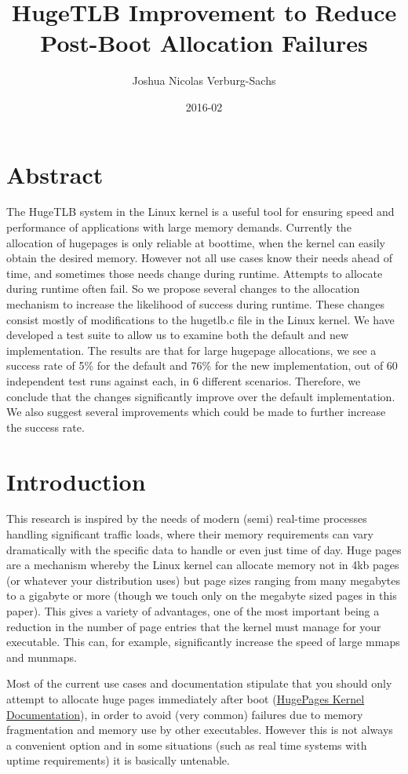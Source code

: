 \documentclass{article}
\title{HugeTLB Improvement to Reduce Post-Boot Allocation Failures}
\date{2016-02}
\author{Joshua Nicolas Verburg-Sachs}
\begin{document}
	\maketitle
	\newpage
	\tableofcontents
	\newpage

	\section{Abstract}
		The HugeTLB system in the Linux kernel is a useful tool for ensuring speed and performance of applications with large memory demands. Currently the allocation of hugepages is only reliable at boottime, when the kernel can easily obtain the desired memory. However not all use cases know their needs ahead of time, and sometimes those needs change during runtime. Attempts to allocate during runtime often fail. So we propose several changes to the allocation mechanism to increase the likelihood of success during runtime. These changes consist mostly of modifications to the hugetlb.c file in the Linux kernel. We have developed a test suite to allow us to examine both the default and new implementation. The results are that for large hugepage allocations, we see a success rate of 5\% for the default and 76\% for the new implementation, out of 60 independent test runs against each, in 6 different scenarios. Therefore, we conclude that the changes significantly improve over the default implementation. We also suggest several improvements which could be made to further increase the success rate.

	\newpage
	\section{Introduction}
		This research is inspired by the needs of modern (semi) real-time processes handling significant traffic loads, where their memory requirements can vary dramatically with the specific data to handle or even just time of day. Huge pages are a mechanism whereby the Linux kernel can allocate memory not in 4kb pages (or whatever your distribution uses) but page sizes ranging from many megabytes to a gigabyte or more (though we touch only on the megabyte sized pages in this paper). This gives a variety of advantages, one of the most important being a reduction in the number of page entries that the kernel must manage for your executable. This can, for example, significantly increase the speed of large mmaps and munmaps.

Most of the current use cases and documentation stipulate that you should only attempt to allocate huge pages immediately after boot (\href{https://www.kernel.org/doc/Documentation/vm/hugetlbpage.txt}{HugePages Kernel Documentation}), in order to avoid (very common) failures due to memory fragmentation and memory use by other executables. However this is not always a convenient option and in some situations (such as real time systems with uptime requirements) it is basically untenable.
\end{document}
